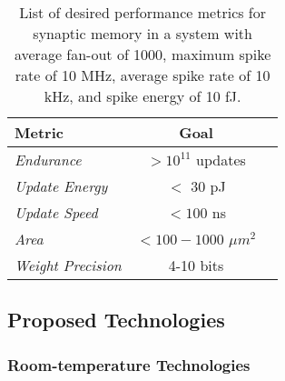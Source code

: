 \documentclass{article}
\begin{document}
\begin{table}[h!]
  \begin{center}
    \label{tab:mathtable}
    \begin{tabular}{l|c|r} %
      \textbf{Metric} & \textbf{Goal} \\
      \hline
      \textit{Endurance} & $>10^{11}$ updates \\
      \textit{Update Energy} & $<$ 30 pJ\\
      \textit{Update Speed} & $<100$ ns \\
      \textit{Area} & $<100-1000$ $\mu m ^2$ \\
      \textit{Weight Precision} & 4-10 bits \cite{pfeil20124}
      
    \end{tabular}
    \caption{List of desired performance metrics for synaptic memory in a system with average fan-out of 1000, maximum spike rate of 10 MHz, average spike rate of 10 kHz, and spike energy of 10 fJ.}
  \end{center}
\end{table}
\subsection{Proposed Technologies}
\subsubsection{Room-temperature Technologies}
\end{document}
